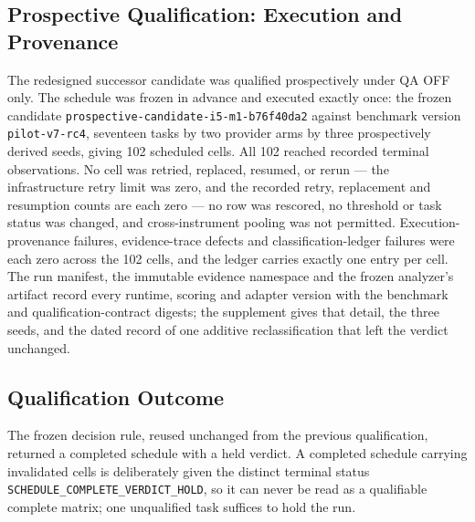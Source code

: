 \documentclass[acmsmall,screen,review,anonymous]{acmart}
\newcommand{\U}{\_\discretionary{}{}{}}
\begin{document}
\subsection{Prospective Qualification: Execution and Provenance}
\label{sec:qualexec}

The redesigned successor candidate was qualified prospectively under QA OFF only.
The schedule was frozen in advance and executed exactly once: the frozen candidate
\texttt{prospective-\discretionary{}{}{}candidate-\discretionary{}{}{}i5-\discretionary{}{}{}m1-\discretionary{}{}{}b76f40da2} against benchmark version
\texttt{pilot-v7-rc4}, seventeen tasks by two provider arms by three prospectively
derived seeds, giving 102 scheduled cells. All 102 reached recorded terminal
observations. No cell was retried, replaced, resumed, or rerun --- the
infrastructure retry limit was zero, and the recorded retry, replacement and
resumption counts are each zero --- no row was rescored, no threshold or task
status was changed, and cross-instrument pooling was not permitted.
Execution-provenance failures, evidence-trace defects and classification-ledger
failures were each zero across the 102 cells, and the ledger carries exactly one
entry per cell. The run manifest, the immutable evidence namespace and the frozen
analyzer's artifact record every runtime, scoring and adapter version with the
benchmark and qualification-contract digests; the supplement gives that detail,
the three seeds, and the dated record of one additive reclassification that left
the verdict unchanged.

\subsection{Qualification Outcome}
\label{sec:qualoutcome}

The frozen decision rule, reused unchanged from the previous qualification,
returned a completed schedule with a held verdict. A completed schedule carrying
invalidated cells is deliberately given the distinct terminal status
\texttt{SCHEDULE\U COMPLETE\U VERDICT\U HOLD}, so it can never be read as a
qualifiable complete matrix; one unqualified task suffices to hold the run.
\end{document}
